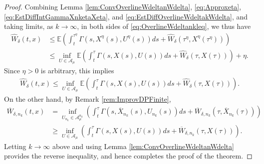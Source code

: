 \documentclass[amscd,amssymb,11pt]{article}
\numberwithin{theorem}{section}
\numberwithin{equation}{section}
\begin{document}
\begin{proof}
Combining Lemma \ref{lem:ConvOverlineWdeltanWdelta}, \eqref{eq:Approxeta}, \eqref{eq:EstDiffIntGammaXnketaXeta}, and \eqref{eq:EstDiffOverlineWdeltakWdelta}, and taking limits, as $k\rightarrow\infty$, in both sides of \eqref{eq:OverlineWdeltankleq}, we thus have
\begin{align*}
\widehat{W}_{\delta}(t,x)&\leq\mathbb{E}\left(\int_{t}^{\tau^{\eta}}\Gamma\left(s,X^{\eta}(s),U^{\eta}(s)\right)ds+\widehat{W}_{\delta}\left(\tau^{\eta},X^{\eta}\left(\tau^{\eta}\right)\right)\right)\\
&\leq\inf_{U\in\mathcal{A}_{\mu}}\mathbb{E}\left(\int_{t}^{\tau}\Gamma\left(s,X(s),U(s)\right)ds+\widehat{W}_{\delta}\left(\tau,X(\tau)\right)\right)+\eta.
\end{align*}
Since $\eta>0$ is arbitrary, this implies
\begin{align*}
\widehat{W}_{\delta}(t,x)\leq\inf_{U\in\mathcal{A}_{\mu}}\mathbb{E}\left(\int_{t}^{\tau}\Gamma\left(s,X(s),U(s)\right)ds+\widehat{W}_{\delta}\left(\tau,X(\tau)\right)\right).
\end{align*}
On the other hand, by Remark \ref{rem:ImprovDPFinite},
\begin{align*}
\overline{W}_{\delta,n_{k}}(t,x)&=\inf_{U_{n_{k}}\in\mathcal{A}_{\mu}^{n_{k}}}\left(\int_{t}^{\tau}\Gamma\left(s,\overline{X}_{n_{k}}(s),U_{n_{k}}(s)\right)ds+\overline{W}_{\delta,n_{k}}\left(\tau,\overline{X}_{n_{k}}(\tau)\right)\right)\\
&\geq\inf_{U\in\mathcal{A}_{\mu}}\left(\int_{t}^{\tau}\Gamma\left(s,X(s),U(s)\right)ds+\overline{W}_{\delta,n_{k}}\left(\tau,X(\tau)\right)\right).
\end{align*}
Letting $k\rightarrow\infty$ above and using Lemma \ref{lem:ConvOverlineWdeltanWdelta} provides the reverse inequality, and hence completes the proof of the theorem.
\end{proof}
\end{document}

